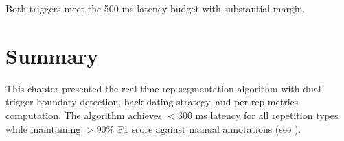 Both triggers meet the 500 ms latency budget with substantial margin.

\section{Summary}

This chapter presented the real-time rep segmentation algorithm with dual-trigger boundary detection, back-dating strategy, and per-rep metrics computation. The algorithm achieves $<$300 ms latency for all repetition types while maintaining $>$90\% F1 score against manual annotations (see ).

\newpage